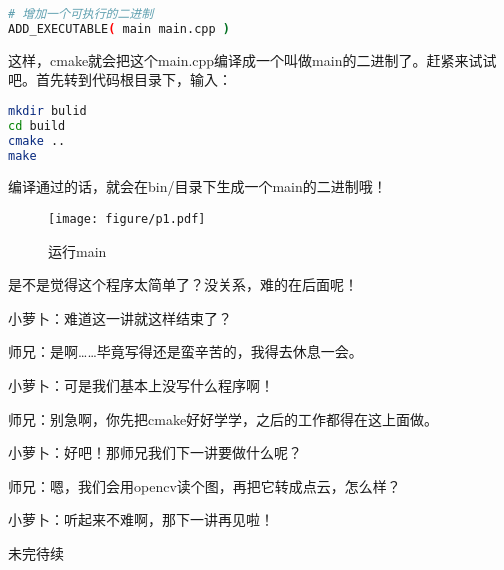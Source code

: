 \documentclass[9pt,a4paper]{article}
\begin{document}
\begin{lstlisting}[language=sh]
# 增加一个可执行的二进制
ADD_EXECUTABLE( main main.cpp )
\end{lstlisting}

这样，cmake就会把这个main.cpp编译成一个叫做main的二进制了。赶紧来试试吧。首先转到代码根目录下，输入：

\begin{lstlisting}[language=sh]
mkdir bulid
cd build
cmake ..
make
\end{lstlisting}

编译通过的话，就会在bin/目录下生成一个main的二进制哦！

\begin{figure}[!htp]
\centering
\texttt{[image: figure/p1.pdf]}
\caption{运行main}
\end{figure}

是不是觉得这个程序太简单了？没关系，难的在后面呢！

小萝卜：难道这一讲就这样结束了？

师兄：是啊……毕竟写得还是蛮辛苦的，我得去休息一会。

小萝卜：可是我们基本上没写什么程序啊！

师兄：别急啊，你先把cmake好好学学，之后的工作都得在这上面做。

小萝卜：好吧！那师兄我们下一讲要做什么呢？

师兄：嗯，我们会用opencv读个图，再把它转成点云，怎么样？

小萝卜：听起来不难啊，那下一讲再见啦！

\begin{framed}
未完待续	
\end{framed}
	
\end{document}
